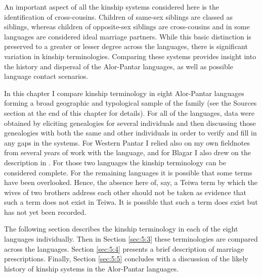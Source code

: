 An important aspect of all the kinship systems considered here is the identification of cross-cousins. Children of same-sex siblings are classed as siblings, whereas children of opposite-sex siblings are cross-cousins and in some languages are considered ideal marriage partners. While this basic distinction is preserved to a greater or lesser degree across the languages, there is significant variation in kinship terminologies. Comparing these systems provides insight into the history and dispersal of the Alor-Pantar languages, as well as possible language contact scenarios.

In this chapter I compare kinship terminology in eight Alor-Pantar languages forming a broad geographic and typological sample of the family (see the Sources section at the end of this chapter for details). For all of the languages, data were obtained by eliciting genealogies for several individuals and then discussing those genealogies with both the same and other individuals in order to verify and fill in any gaps in the systems. For Western Pantar I relied also on my own fieldnotes from several years of work with the language, and for Blagar I also drew on the description in \citet{Steinhauer1993}. For those two languages the kinship terminology can be considered complete. For the remaining languages it is possible that some terms have been overlooked. Hence, the absence here of, say, a Teiwa term by which the wives of two brothers address each other should not be taken as evidence that such a term does not exist in Teiwa. It is possible that such a term does exist but has not yet been recorded.

The following section describes the kinship terminology in each of the eight languages individually. Then in Section \ref{sec:5:3} these terminologies are compared across the languages. Section \ref{sec:5:4} presents a brief description of marriage prescriptions. Finally, Section \ref{sec:5:5} concludes with a discussion of the likely history of kinship systems in the Alor-Pantar languages. 


